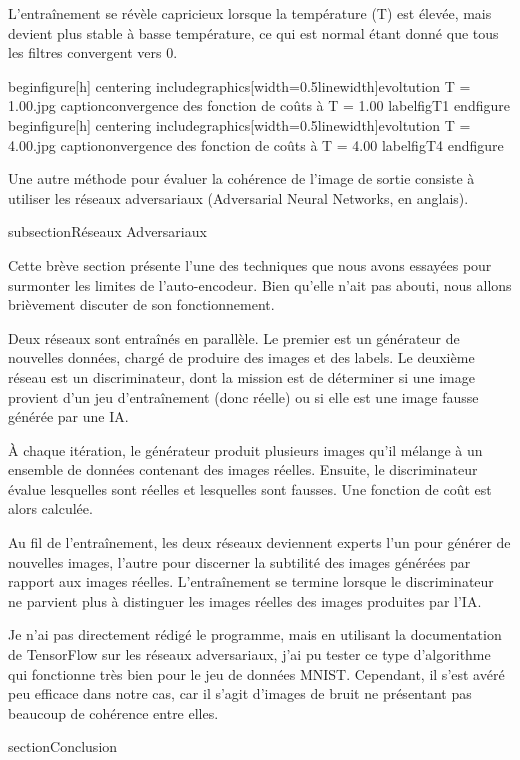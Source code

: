 L'entraînement se révèle capricieux lorsque la température (T) est élevée, mais devient plus stable à basse température, ce qui est normal étant donné que tous les filtres convergent vers 0.

begin{figure}[h]
	centering
	includegraphics[width=0.5linewidth]{evoltution T = 1.00.jpg}
	caption{convergence des fonction de coûts à T = 1.00}
	label{figT1}
end{figure}
begin{figure}[h]
	centering
	includegraphics[width=0.5linewidth]{evoltution T = 4.00.jpg}
	caption{onvergence des fonction de coûts à T = 4.00}
	label{figT4}
end{figure}

Une autre méthode pour évaluer la cohérence de l'image de sortie consiste à utiliser les réseaux adversariaux (Adversarial Neural Networks, en anglais).

subsection{Réseaux Adversariaux}

Cette brève section présente l'une des techniques que nous avons essayées pour surmonter les limites de l'auto-encodeur. Bien qu'elle n'ait pas abouti, nous allons brièvement discuter de son fonctionnement.

Deux réseaux sont entraînés en parallèle. Le premier est un générateur de nouvelles données, chargé de produire des images et des labels. Le deuxième réseau est un discriminateur, dont la mission est de déterminer si une image provient d'un jeu d'entraînement (donc réelle) ou si elle est une image fausse générée par une IA.

À chaque itération, le générateur produit plusieurs images qu'il mélange à un ensemble de données contenant des images réelles. Ensuite, le discriminateur évalue lesquelles sont réelles et lesquelles sont fausses. Une fonction de coût est alors calculée.

Au fil de l'entraînement, les deux réseaux deviennent experts  l'un pour générer de nouvelles images, l'autre pour discerner la subtilité des images générées par rapport aux images réelles. L'entraînement se termine lorsque le discriminateur ne parvient plus à distinguer les images réelles des images produites par l'IA.

Je n'ai pas directement rédigé le programme, mais en utilisant la documentation de TensorFlow sur les réseaux adversariaux, j'ai pu tester ce type d'algorithme qui fonctionne très bien pour le jeu de données MNIST. Cependant, il s'est avéré peu efficace dans notre cas, car il s'agit d'images de bruit ne présentant pas beaucoup de cohérence entre elles.



section{Conclusion}

